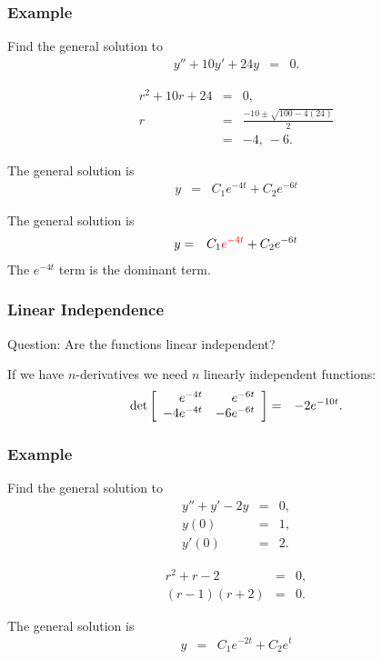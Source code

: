 \begin{frame}
  \frametitle{Example}

  Find the general solution to
  \begin{eqnarray*}
    y'' + 10 y' + 24y & = & 0.
  \end{eqnarray*}

  {
    \begin{eqnarray*}
      r^2 + 10r + 24 & = & 0, \\
      r & = & \frac{-10\pm\sqrt{100-4(24)}}{2} \\
      & = & -4,~ -6.
    \end{eqnarray*}
  }

  {
    The general solution is
    \begin{eqnarray*}
      y & = & C_1 e^{-4t} + C_2 e^{-6t}
    \end{eqnarray*}
  }

  {
    The general solution is
    \begin{eqnarray*}
      y & = & C_1 {\color{red}e^{-4t}} + C_2 e^{-6t}
    \end{eqnarray*}
    The $e^{-4t}$ term is the dominant term.
  }


\end{frame}

\begin{frame}
  \frametitle{Linear Independence}

  Question: Are the functions linear independent?

  {

    If we have $n$-derivatives we need $n$ linearly independent
    functions:
    \begin{eqnarray*}
      \mathrm{det}\left[ \begin{array}{rr} e^{-4t} & e^{-6t} \\ -4e^{-4t} & -6e^{-6t} \end{array} \right]
      & = & -2 e^{-10t}.
    \end{eqnarray*}

  }

\end{frame}


\begin{frame}
  \frametitle{Example}

  Find the general solution to
  \begin{eqnarray*}
    y'' + y' - 2y & = & 0, \\
    y(0) & = & 1, \\
    y'(0) & = & 2.
  \end{eqnarray*}

  {
    \begin{eqnarray*}
      r^2 + r - 2 & = & 0, \\
      (r-1)(r+2) & = & 0.
    \end{eqnarray*}

    The general solution is
    \begin{eqnarray*}
      y & = & C_1 e^{-2t} + C_2 e^{t}
    \end{eqnarray*}

  }


\end{frame}

